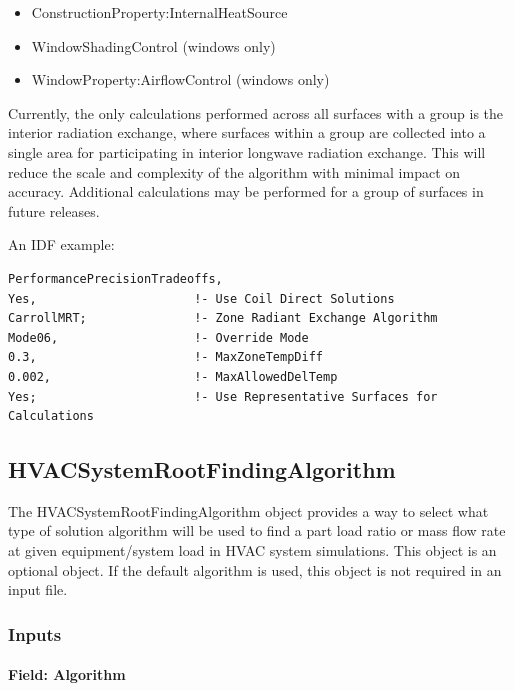 \begin{itemize}
    \item ConstructionProperty:InternalHeatSource
    \item WindowShadingControl (windows only)
    \item WindowProperty:AirflowControl (windows only)
\end{itemize}

Currently, the only calculations performed across all surfaces with a group is the interior radiation exchange, where surfaces within a group are collected into a single area for participating in interior longwave radiation exchange. This will reduce the scale and complexity of the algorithm with minimal impact on accuracy. Additional calculations may be performed for a group of surfaces in future releases.

An IDF example:

\begin{lstlisting}
PerformancePrecisionTradeoffs,
Yes,                      !- Use Coil Direct Solutions
CarrollMRT;               !- Zone Radiant Exchange Algorithm
Mode06,                   !- Override Mode
0.3,                      !- MaxZoneTempDiff
0.002,                    !- MaxAllowedDelTemp
Yes;                      !- Use Representative Surfaces for Calculations
\end{lstlisting}


\subsection{HVACSystemRootFindingAlgorithm}\label{hvacystemrootfindingalgorithm}

The HVACSystemRootFindingAlgorithm object provides a way to select what type of solution
algorithm will be used to find a part load ratio or mass flow rate at given equipment/system load in HVAC system simulations. This object is an optional object. If the default algorithm is used, this object is not required in an input file.


\subsubsection{Inputs}\label{inputs-hvacystemrootfindingalgorithm}

\paragraph{Field: Algorithm}\label{field-algorithm-201710020807}


